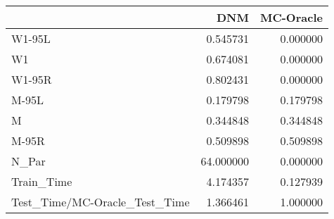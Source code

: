 \begin{tabular}{lrr}
\toprule
{} &        DNM &  MC-Oracle \\
\midrule
W1-95L                        &   0.545731 &   0.000000 \\
W1                            &   0.674081 &   0.000000 \\
W1-95R                        &   0.802431 &   0.000000 \\
M-95L                         &   0.179798 &   0.179798 \\
M                             &   0.344848 &   0.344848 \\
M-95R                         &   0.509898 &   0.509898 \\
N\_Par                         &  64.000000 &   0.000000 \\
Train\_Time                    &   4.174357 &   0.127939 \\
Test\_Time/MC-Oracle\_Test\_Time &   1.366461 &   1.000000 \\
\bottomrule
\end{tabular}
